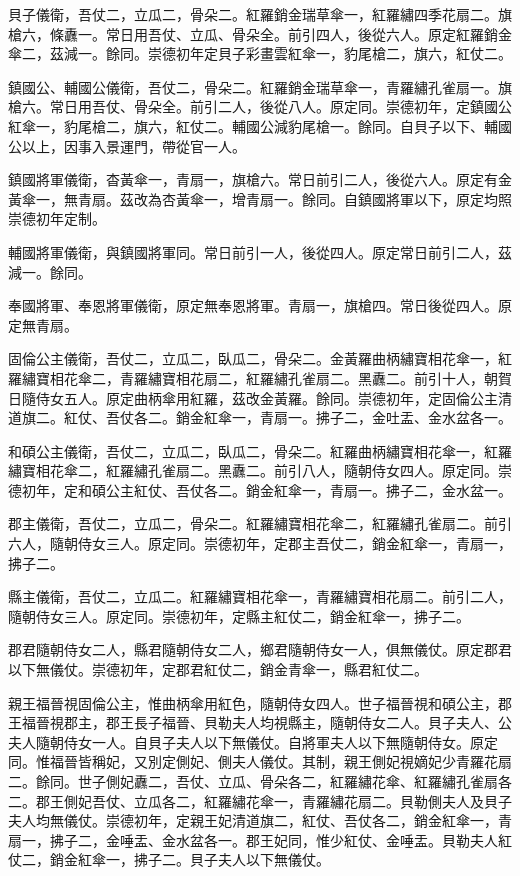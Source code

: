 \begin{pinyinscope}
貝子儀衛，吾仗二，立瓜二，骨朵二。紅羅銷金瑞草傘一，紅羅繡四季花扇二。旗槍六，條纛一。常日用吾仗、立瓜、骨朵全。前引四人，後從六人。原定紅羅銷金傘二，茲減一。餘同。崇德初年定貝子彩畫雲紅傘一，豹尾槍二，旗六，紅仗二。

鎮國公、輔國公儀衛，吾仗二，骨朵二。紅羅銷金瑞草傘一，青羅繡孔雀扇一。旗槍六。常日用吾仗、骨朵全。前引二人，後從八人。原定同。崇德初年，定鎮國公紅傘一，豹尾槍二，旗六，紅仗二。輔國公減豹尾槍一。餘同。自貝子以下、輔國公以上，因事入景運門，帶從官一人。

鎮國將軍儀衛，杳黃傘一，青扇一，旗槍六。常日前引二人，後從六人。原定有金黃傘一，無青扇。茲改為杏黃傘一，增青扇一。餘同。自鎮國將軍以下，原定均照崇德初年定制。

輔國將軍儀衛，與鎮國將軍同。常日前引一人，後從四人。原定常日前引二人，茲減一。餘同。

奉國將軍、奉恩將軍儀衛，原定無奉恩將軍。青扇一，旗槍四。常日後從四人。原定無青扇。

固倫公主儀衛，吾仗二，立瓜二，臥瓜二，骨朵二。金黃羅曲柄繡寶相花傘一，紅羅繡寶相花傘二，青羅繡寶相花扇二，紅羅繡孔雀扇二。黑纛二。前引十人，朝賀日隨侍女五人。原定曲柄傘用紅羅，茲改金黃羅。餘同。崇德初年，定固倫公主清道旗二。紅仗、吾仗各二。銷金紅傘一，青扇一。拂子二，金吐盂、金水盆各一。

和碩公主儀衛，吾仗二，立瓜二，臥瓜二，骨朵二。紅羅曲柄繡寶相花傘一，紅羅繡寶相花傘二，紅羅繡孔雀扇二。黑纛二。前引八人，隨朝侍女四人。原定同。崇德初年，定和碩公主紅仗、吾仗各二。銷金紅傘一，青扇一。拂子二，金水盆一。

郡主儀衛，吾仗二，立瓜二，骨朵二。紅羅繡寶相花傘二，紅羅繡孔雀扇二。前引六人，隨朝侍女三人。原定同。崇德初年，定郡主吾仗二，銷金紅傘一，青扇一，拂子二。

縣主儀衛，吾仗二，立瓜二。紅羅繡寶相花傘一，青羅繡寶相花扇二。前引二人，隨朝侍女三人。原定同。崇德初年，定縣主紅仗二，銷金紅傘一，拂子二。

郡君隨朝侍女二人，縣君隨朝侍女二人，鄉君隨朝侍女一人，俱無儀仗。原定郡君以下無儀仗。崇德初年，定郡君紅仗二，銷金青傘一，縣君紅仗二。

親王福晉視固倫公主，惟曲柄傘用紅色，隨朝侍女四人。世子福晉視和碩公主，郡王福晉視郡主，郡王長子福晉、貝勒夫人均視縣主，隨朝侍女二人。貝子夫人、公夫人隨朝侍女一人。自貝子夫人以下無儀仗。自將軍夫人以下無隨朝侍女。原定同。惟福晉皆稱妃，又別定側妃、側夫人儀仗。其制，親王側妃視嫡妃少青羅花扇二。餘同。世子側妃纛二，吾仗、立瓜、骨朵各二，紅羅繡花傘、紅羅繡孔雀扇各二。郡王側妃吾仗、立瓜各二，紅羅繡花傘一，青羅繡花扇二。貝勒側夫人及貝子夫人均無儀仗。崇德初年，定親王妃清道旗二，紅仗、吾仗各二，銷金紅傘一，青扇一，拂子二，金唾盂、金水盆各一。郡王妃同，惟少紅仗、金唾盂。貝勒夫人紅仗二，銷金紅傘一，拂子二。貝子夫人以下無儀仗。


\end{pinyinscope}
